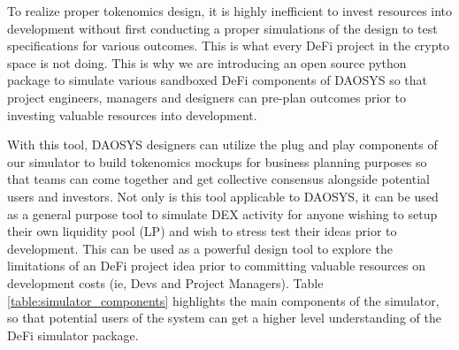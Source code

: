 \documentclass[journal,twocolumn,12pt]{ieeesyscoin}
\begin{document}
To realize proper tokenomics design, it is highly inefficient to invest resources into development without first conducting a proper simulations of the design to test specifications for various outcomes. This is what every DeFi project in the crypto space is not doing. This is why we are introducing an open source python package to simulate various sandboxed DeFi components of DAOSYS so that project engineers, managers and designers can pre-plan outcomes prior to investing valuable resources into development.

With this tool, DAOSYS designers can utilize the plug and play components of our simulator to build tokenomics mockups for business planning purposes so that teams can come together and get collective consensus alongside potential users and investors. Not only is this tool applicable to DAOSYS, it can be used as a general purpose tool to simulate DEX activity for anyone wishing to setup their own liquidity pool (LP) and wish to stress test their ideas prior to development. This can be used as a powerful design tool to explore the limitations of an DeFi project idea prior to committing valuable resources on development costs (ie, Devs and Project Managers). Table \ref{table:simulator_components} highlights the main components of the simulator, so that potential users of the system can get a higher level understanding of the DeFi simulator package.
\end{document}
